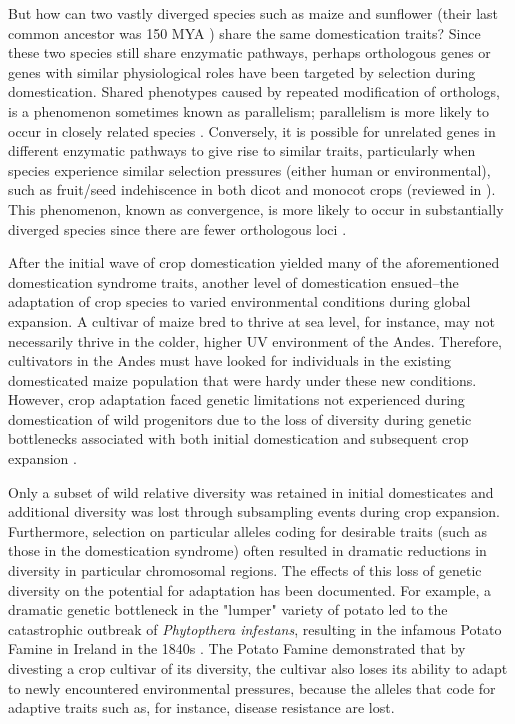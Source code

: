 \documentclass[12pt]{article}
\begin{document}
But how can two vastly diverged species such as maize and sunflower  (their last common ancestor was 150 MYA \citep{Chang2004}) share the same domestication traits? 
Since these two species still share enzymatic pathways, perhaps orthologous genes or genes with similar physiological roles have been targeted by selection during domestication.
Shared phenotypes caused by repeated modification of orthologs, is a phenomenon sometimes known as parallelism; parallelism is more likely to occur in closely related species \citep{Pickersgill2018}.
Conversely, it is possible for unrelated genes in different enzymatic pathways to give rise to similar traits, particularly when species experience similar selection pressures (either human or environmental), such as fruit/seed indehiscence in both dicot and monocot crops (reviewed in \citep{Dong2015}).
This phenomenon, known as convergence, is more likely to occur in substantially diverged species since there are fewer orthologous loci \citep{Washburn2016, Pickersgill2018}.

After the initial wave of crop domestication yielded many of the aforementioned domestication syndrome traits, another level of domestication ensued--the adaptation of crop species to varied environmental conditions during global expansion.
A cultivar of maize bred to thrive at sea level, for instance, may not necessarily thrive in the colder, higher UV environment of the Andes.
Therefore, cultivators in the Andes must have looked for individuals in the existing domesticated maize population that were hardy under these new conditions.
However, crop adaptation faced genetic limitations not experienced during domestication of wild progenitors due to the loss of diversity during genetic bottlenecks associated with both initial domestication and subsequent crop expansion \cite{Wang2017}. 

Only a subset of wild relative diversity was retained in initial domesticates and additional diversity was lost through subsampling events during crop expansion.
Furthermore, selection on particular alleles coding for desirable traits (such as those in the domestication syndrome) often resulted in dramatic reductions in diversity in particular chromosomal regions.
The effects of this loss of genetic diversity on the potential for adaptation has been documented.
For example, a dramatic genetic bottleneck in the "lumper" variety of potato led to the catastrophic outbreak of \emph{Phytopthera infestans}, resulting in the infamous Potato Famine in Ireland in the 1840s \citep{Goodwin1994}.
The Potato Famine demonstrated that by divesting a crop cultivar of its diversity, the cultivar also loses its ability to adapt to newly encountered environmental pressures, because the alleles that code for adaptive traits such as, for instance, disease resistance are lost.
\end{document}
